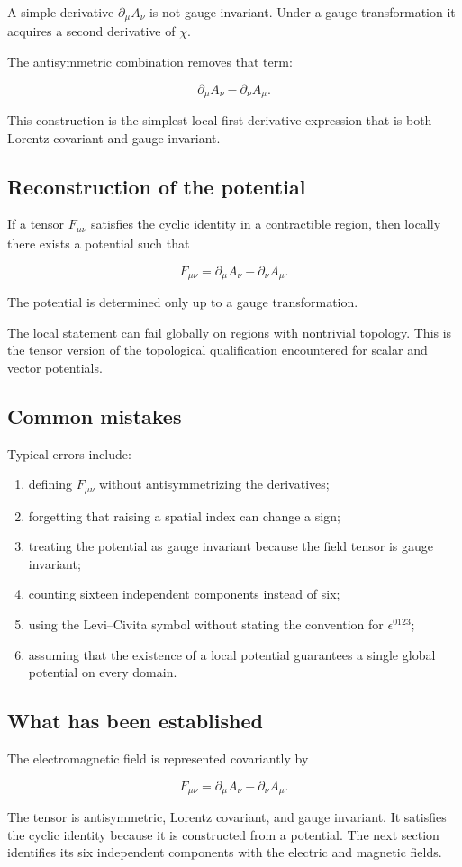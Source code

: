 A simple derivative \(\partial_{\mu}A_{\nu}\) is not gauge invariant. Under a gauge transformation it acquires a second derivative of \(\chi\).

The antisymmetric combination removes that term:

\[
\partial_{\mu}A_{\nu}
-
\partial_{\nu}A_{\mu}.
\]

This construction is the simplest local first-derivative expression that is both Lorentz covariant and gauge invariant.

\subsection{Reconstruction of the potential}

If a tensor \(F_{\mu\nu}\) satisfies the cyclic identity in a contractible region, then locally there exists a potential such that

\[
F_{\mu\nu}
=
\partial_{\mu}A_{\nu}
-
\partial_{\nu}A_{\mu}.
\]

The potential is determined only up to a gauge transformation.

The local statement can fail globally on regions with nontrivial topology. This is the tensor version of the topological qualification encountered for scalar and vector potentials.

\subsection{Common mistakes}

Typical errors include:

\begin{enumerate}
    \item defining \(F_{\mu\nu}\) without antisymmetrizing the derivatives;
    \item forgetting that raising a spatial index can change a sign;
    \item treating the potential as gauge invariant because the field tensor is gauge invariant;
    \item counting sixteen independent components instead of six;
    \item using the Levi--Civita symbol without stating the convention for \(\epsilon^{0123}\);
    \item assuming that the existence of a local potential guarantees a single global potential on every domain.
\end{enumerate}

\subsection{What has been established}

The electromagnetic field is represented covariantly by

\[
F_{\mu\nu}
=
\partial_{\mu}A_{\nu}
-
\partial_{\nu}A_{\mu}.
\]

The tensor is antisymmetric, Lorentz covariant, and gauge invariant. It satisfies the cyclic identity because it is constructed from a potential. The next section identifies its six independent components with the electric and magnetic fields.

